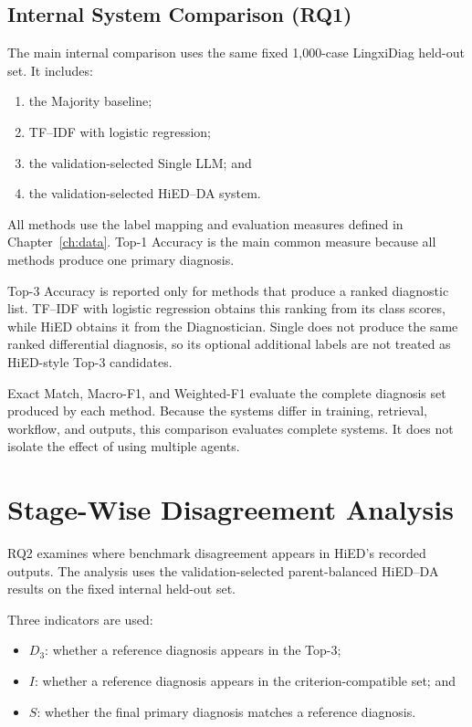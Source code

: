 \documentclass[12pt,a4paper,oneside]{report}
\begin{document}
\subsection{Internal System Comparison (RQ1)}

The main internal comparison uses the same fixed 1,000-case LingxiDiag
held-out set. It includes:

\begin{enumerate}
    \item the Majority baseline;
    \item TF--IDF with logistic regression;
    \item the validation-selected Single LLM; and
    \item the validation-selected HiED--DA system.
\end{enumerate}

All methods use the label mapping and evaluation measures defined in
Chapter~\ref{ch:data}. Top-1 Accuracy is the main common measure because
all methods produce one primary diagnosis.

Top-3 Accuracy is reported only for methods that produce a ranked
diagnostic list. TF--IDF with logistic regression obtains this ranking
from its class scores, while HiED obtains it from the Diagnostician.
Single does not produce the same ranked differential diagnosis, so its
optional additional labels are not treated as HiED-style Top-3
candidates.

Exact Match, Macro-F1, and Weighted-F1 evaluate the complete diagnosis
set produced by each method. Because the systems differ in training,
retrieval, workflow, and outputs, this comparison evaluates complete
systems. It does not isolate the effect of using multiple agents.

\section{Stage-Wise Disagreement Analysis}
\label{sec:stage-wise-analysis-design}

RQ2 examines where benchmark disagreement appears in HiED's recorded
outputs. The analysis uses the validation-selected parent-balanced
HiED--DA results on the fixed internal held-out set.

Three indicators are used:

\begin{itemize}
    \item $D_3$: whether a reference diagnosis appears in the Top-3;
    \item $I$: whether a reference diagnosis appears in the
    criterion-compatible set; and
    \item $S$: whether the final primary diagnosis matches a reference
    diagnosis.
\end{itemize}
\end{document}
